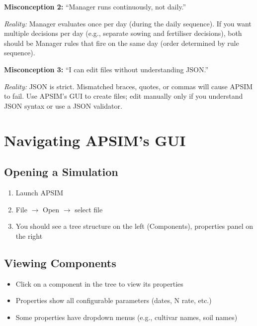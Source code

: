 \begin{warningbox}
\textbf{Misconception 2:} ``Manager runs continuously, not daily.''

\textit{Reality:} Manager evaluates once per day (during the daily sequence). If you want multiple decisions per day (e.g., separate sowing and fertiliser decisions), both should be Manager rules that fire on the same day (order determined by rule sequence).
\end{warningbox}

\begin{warningbox}
\textbf{Misconception 3:} ``I can edit  files without understanding JSON.''

\textit{Reality:} JSON is strict. Mismatched braces, quotes, or commas will cause APSIM to fail. Use APSIM's GUI to create files; edit manually only if you understand JSON syntax or use a JSON validator.
\end{warningbox}

\section{Navigating APSIM's GUI}

\subsection{Opening a Simulation}

\begin{enumerate}
  \item Launch APSIM
  \item File $\to$ Open $\to$ select  file
  \item You should see a tree structure on the left (Components), properties panel on the right
\end{enumerate}

\subsection{Viewing Components}

\begin{itemize}
  \item Click on a component in the tree to view its properties
  \item Properties show all configurable parameters (dates, N rate, etc.)
  \item Some properties have dropdown menus (e.g., cultivar names, soil names)
\end{itemize}

